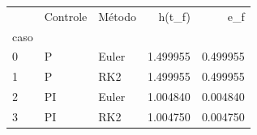 \begin{tabular}{lllrr}
\toprule
 & Controle & Método & h(t_f) & e_f \\
caso &  &  &  &  \\
\midrule
0 & P & Euler & 1.499955 & 0.499955 \\
1 & P & RK2 & 1.499955 & 0.499955 \\
2 & PI & Euler & 1.004840 & 0.004840 \\
3 & PI & RK2 & 1.004750 & 0.004750 \\
\bottomrule
\end{tabular}
